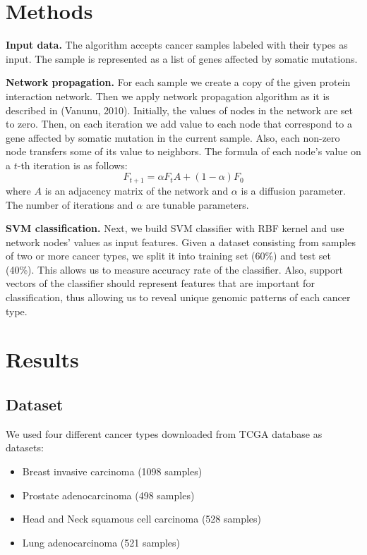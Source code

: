\documentclass[a4paper]{article}
\begin{document}
\section{Methods}

\textbf{Input data.}
The algorithm accepts cancer samples labeled with their types as input.
The sample is represented as a list of genes affected by somatic mutations.

\textbf{Network propagation.}
For each sample we create a copy of the given protein interaction network. Then
we apply network propagation algorithm as it is described in (Vanunu, 2010).
Initially, the values of nodes in the network are set to zero. Then, on each 
iteration we add value to each node that correspond to a gene affected by 
somatic mutation in the current sample. Also, each non-zero node
transfers some of its value to neighbors. The formula of each node's value
on a $t$-th iteration is as follows:
\begin{equation}
F_{t+1} = \alpha F_t A + (1 - \alpha) F_0
\end{equation}
where $A$ is an adjacency matrix of the network and $\alpha$ is a diffusion parameter.
The number of iterations and $\alpha$ are tunable parameters.

\textbf{SVM classification.}
Next, we build SVM classifier with RBF kernel and use network nodes' values
as input features. Given a dataset consisting from samples of two or more cancer types,
we split it into training set (60\%) and test set (40\%). This allows us to measure
accuracy rate of the classifier. Also, support vectors of the classifier should
represent features that are important for classification, thus allowing us
to reveal unique genomic patterns of each cancer type.

\section{Results}

\subsection{Dataset}
We used four different cancer types downloaded from TCGA database as datasets: 
\begin{itemize}
\item Breast invasive carcinoma (1098 samples)
\item Prostate adenocarcinoma (498 samples)
\item Head and Neck squamous cell carcinoma (528 samples)
\item Lung adenocarcinoma (521 samples)
\end{itemize}
\end{document}
